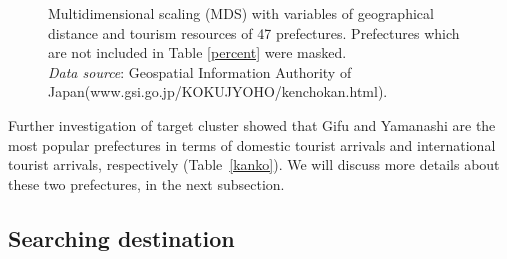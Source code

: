 \documentclass[10pt, conference, compsocconf]{IEEEtran}
\begin{document}
\begin{figure}[!t]
\centering
{}
\qquad
{}
\caption{Multidimensional scaling (MDS) with variables of geographical distance and tourism resources of 47 prefectures. Prefectures which are not included in Table \ref{percent} were masked.
\\{\it Data source}: Geospatial Information Authority of Japan(www.gsi.go.jp/KOKUJYOHO/kenchokan.html).}\label{multi}
\end{figure}




Further investigation of target cluster showed that Gifu and Yamanashi are the most popular  prefectures in terms of domestic tourist arrivals and international tourist arrivals, respectively (Table~\ref{kanko}).
We will discuss more details about these two prefectures, in the next subsection.


\subsection{Searching destination}
\end{document}
